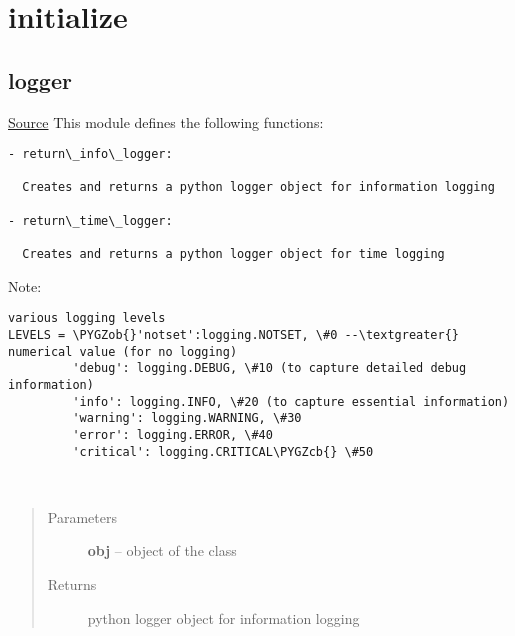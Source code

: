 \documentclass[letterpaper,10pt,english]{sphinxmanual}
\def\PYGZob{\char`\{}
\def\PYGZcb{\char`\}}
\begin{document}
\chapter{initialize}
\label{index:initialize}

\section{logger}
\label{index:logger}
\href{https://bitbucket.org/akadar/brakesqueal0.1/src/10fdbd0824e88ebbee4f44cefa781c01e586db41/brake/initialize/logger.py?at=master}{Source}
\label{index:module-brake.initialize.logger}
This module defines the following functions:

\begin{Verbatim}[commandchars=\\\{\}]
- return\_info\_logger:
  
  Creates and returns a python logger object for information logging
  
- return\_time\_logger:
  
  Creates and returns a python logger object for time logging
\end{Verbatim}

Note:

\begin{Verbatim}[commandchars=\\\{\}]
various logging levels
LEVELS = \PYGZob{}'notset':logging.NOTSET, \#0 --\textgreater{} numerical value (for no logging)
         'debug': logging.DEBUG, \#10 (to capture detailed debug information)
         'info': logging.INFO, \#20 (to capture essential information)
         'warning': logging.WARNING, \#30
         'error': logging.ERROR, \#40
         'critical': logging.CRITICAL\PYGZcb{} \#50
\end{Verbatim}

\begin{fulllineitems}
\label{index:brake.initialize.logger.return_info_logger}~\begin{quote}\begin{description}
\item[{Parameters}] \leavevmode
\textbf{obj} -- object of the class 

\item[{Returns}] \leavevmode
{} python logger object for information logging

\end{description}\end{quote}

\end{fulllineitems}
\end{document}
